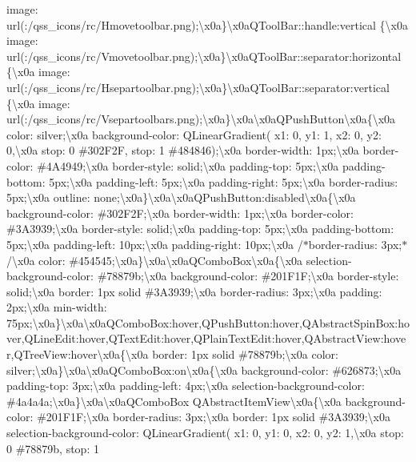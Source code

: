 image\+: url(\+:/qss\+\_\+icons/rc/\+Hmovetoolbar.\+png);\textbackslash{}x0a\}\textbackslash{}x0a\+Q\+Tool\+Bar\+::handle\+:vertical \{\textbackslash{}x0a image\+: url(\+:/qss\+\_\+icons/rc/\+Vmovetoolbar.\+png);\textbackslash{}x0a\}\textbackslash{}x0a\+Q\+Tool\+Bar\+::separator\+:horizontal \{\textbackslash{}x0a image\+: url(\+:/qss\+\_\+icons/rc/\+Hsepartoolbar.\+png);\textbackslash{}x0a\}\textbackslash{}x0a\+Q\+Tool\+Bar\+::separator\+:vertical \{\textbackslash{}x0a image\+: url(\+:/qss\+\_\+icons/rc/\+Vsepartoolbars.\+png);\textbackslash{}x0a\}\textbackslash{}x0a\textbackslash{}x0a\+Q\+Push\+Button\textbackslash{}x0a\{\textbackslash{}x0a color\+: silver;\textbackslash{}x0a background-\/color\+: Q\+Linear\+Gradient( x1\+: 0, y1\+: 1, x2\+: 0, y2\+: 0,\textbackslash{}x0a stop\+: 0 \#302\+F2\+F, stop\+: 1 \#484846);\textbackslash{}x0a border-\/width\+: 1px;\textbackslash{}x0a border-\/color\+: \#4\+A4949;\textbackslash{}x0a border-\/style\+: solid;\textbackslash{}x0a padding-\/top\+: 5px;\textbackslash{}x0a padding-\/bottom\+: 5px;\textbackslash{}x0a padding-\/left\+: 5px;\textbackslash{}x0a padding-\/right\+: 5px;\textbackslash{}x0a border-\/radius\+: 5px;\textbackslash{}x0a outline\+: none;\textbackslash{}x0a\}\textbackslash{}x0a\textbackslash{}x0a\+Q\+Push\+Button\+:disabled\textbackslash{}x0a\{\textbackslash{}x0a background-\/color\+: \#302\+F2\+F;\textbackslash{}x0a border-\/width\+: 1px;\textbackslash{}x0a border-\/color\+: \#3\+A3939;\textbackslash{}x0a border-\/style\+: solid;\textbackslash{}x0a padding-\/top\+: 5px;\textbackslash{}x0a padding-\/bottom\+: 5px;\textbackslash{}x0a padding-\/left\+: 10px;\textbackslash{}x0a padding-\/right\+: 10px;\textbackslash{}x0a /$\ast$border-\/radius\+: 3px;$\ast$/\textbackslash{}x0a color\+: \#454545;\textbackslash{}x0a\}\textbackslash{}x0a\textbackslash{}x0a\+Q\+Combo\+Box\textbackslash{}x0a\{\textbackslash{}x0a selection-\/background-\/color\+: \#78879b;\textbackslash{}x0a background-\/color\+: \#201\+F1\+F;\textbackslash{}x0a border-\/style\+: solid;\textbackslash{}x0a border\+: 1px solid \#3\+A3939;\textbackslash{}x0a border-\/radius\+: 3px;\textbackslash{}x0a padding\+: 2px;\textbackslash{}x0a min-\/width\+: 75px;\textbackslash{}x0a\}\textbackslash{}x0a\textbackslash{}x0a\+Q\+Combo\+Box\+:hover,\+Q\+Push\+Button\+:hover,\+Q\+Abstract\+Spin\+Box\+:hover,\+Q\+Line\+Edit\+:hover,\+Q\+Text\+Edit\+:hover,\+Q\+Plain\+Text\+Edit\+:hover,\+Q\+Abstract\+View\+:hover,\+Q\+Tree\+View\+:hover\textbackslash{}x0a\{\textbackslash{}x0a border\+: 1px solid \#78879b;\textbackslash{}x0a color\+: silver;\textbackslash{}x0a\}\textbackslash{}x0a\textbackslash{}x0a\+Q\+Combo\+Box\+:on\textbackslash{}x0a\{\textbackslash{}x0a background-\/color\+: \#626873;\textbackslash{}x0a padding-\/top\+: 3px;\textbackslash{}x0a padding-\/left\+: 4px;\textbackslash{}x0a selection-\/background-\/color\+: \#4a4a4a;\textbackslash{}x0a\}\textbackslash{}x0a\textbackslash{}x0a\+Q\+Combo\+Box Q\+Abstract\+Item\+View\textbackslash{}x0a\{\textbackslash{}x0a background-\/color\+: \#201\+F1\+F;\textbackslash{}x0a border-\/radius\+: 3px;\textbackslash{}x0a border\+: 1px solid \#3\+A3939;\textbackslash{}x0a selection-\/background-\/color\+: Q\+Linear\+Gradient( x1\+: 0, y1\+: 0, x2\+: 0, y2\+: 1,\textbackslash{}x0a stop\+: 0 \#78879b, stop\+: 1 